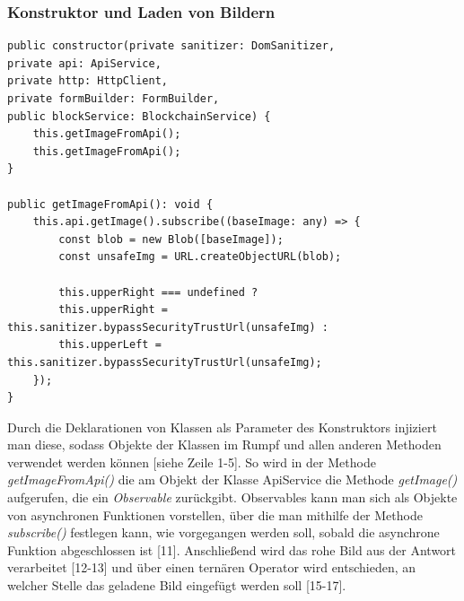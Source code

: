 \subsubsection{Konstruktor und Laden von Bildern}
\begin{lstlisting}
public constructor(private sanitizer: DomSanitizer,
private api: ApiService,
private http: HttpClient,
private formBuilder: FormBuilder,
public blockService: BlockchainService) {
	this.getImageFromApi();
	this.getImageFromApi();
}

public getImageFromApi(): void {
	this.api.getImage().subscribe((baseImage: any) => {
		const blob = new Blob([baseImage]);
		const unsafeImg = URL.createObjectURL(blob);
		
		this.upperRight === undefined ?
		this.upperRight = this.sanitizer.bypassSecurityTrustUrl(unsafeImg) :
		this.upperLeft = this.sanitizer.bypassSecurityTrustUrl(unsafeImg);
	});
}
\end{lstlisting}
Durch die Deklarationen von Klassen als Parameter des Konstruktors injiziert man diese, sodass Objekte der Klassen im Rumpf und allen anderen Methoden verwendet werden können [siehe Zeile 1-5]. So wird in der Methode \emph{getImageFromApi()} die am Objekt der Klasse ApiService die Methode \emph{getImage()} aufgerufen, die ein \emph{Observable} zurückgibt. Observables kann man sich als Objekte von asynchronen Funktionen vorstellen, über die man mithilfe der Methode \emph{subscribe()} festlegen kann, wie vorgegangen werden soll, sobald die asynchrone Funktion abgeschlossen ist [11]. Anschließend wird das rohe Bild aus der Antwort verarbeitet [12-13] und über einen ternären Operator wird entschieden, an welcher Stelle das geladene Bild eingefügt werden soll [15-17].
